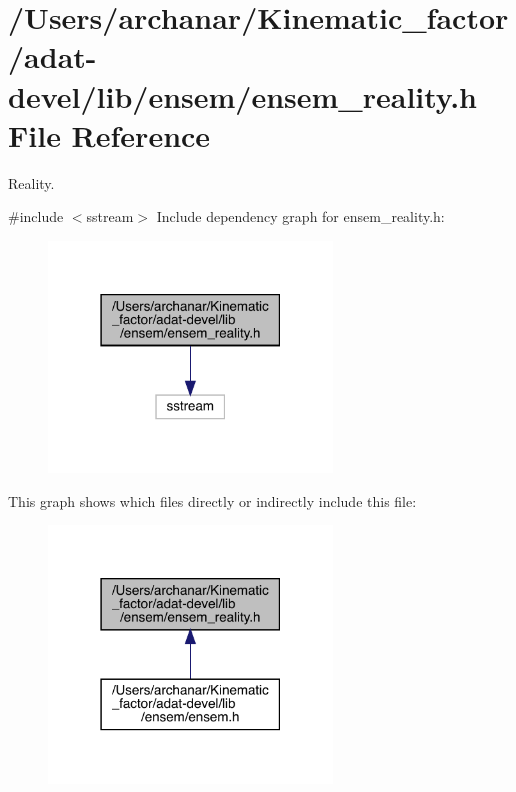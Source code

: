 \hypertarget{adat-devel_2lib_2ensem_2ensem__reality_8h}{}\section{/\+Users/archanar/\+Kinematic\+\_\+factor/adat-\/devel/lib/ensem/ensem\+\_\+reality.h File Reference}
\label{adat-devel_2lib_2ensem_2ensem__reality_8h}


Reality.  


{\ttfamily \#include $<$sstream$>$}\newline
Include dependency graph for ensem\+\_\+reality.\+h\+:
\nopagebreak
\begin{figure}[H]
\begin{center}
\leavevmode
\includegraphics[width=214pt]{d4/dee/adat-devel_2lib_2ensem_2ensem__reality_8h__incl}
\end{center}
\end{figure}
This graph shows which files directly or indirectly include this file\+:
\nopagebreak
\begin{figure}[H]
\begin{center}
\leavevmode
\includegraphics[width=214pt]{d4/de5/adat-devel_2lib_2ensem_2ensem__reality_8h__dep__incl}
\end{center}
\end{figure}
